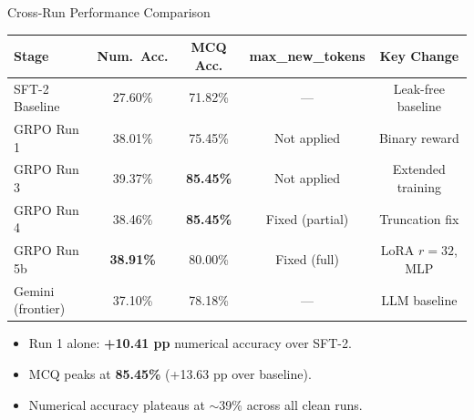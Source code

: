 \documentclass[10pt]{beamer}
\begin{document}
\begin{frame}{Cross-Run Performance Comparison}
\begin{center}
\footnotesize
\begin{tabular}{lcccc}
    \toprule
    \textbf{Stage} & \textbf{Num.\ Acc.} & \textbf{MCQ Acc.} & \textbf{max\_new\_tokens} & \textbf{Key Change} \\
    \midrule
    SFT-2 Baseline & 27.60\% & 71.82\% & --- & Leak-free baseline \\
    GRPO Run 1 & 38.01\% & 75.45\% & Not applied & Binary reward \\
    GRPO Run 3 & 39.37\% & \textbf{85.45\%} & Not applied & Extended training \\
    GRPO Run 4 & 38.46\% & \textbf{85.45\%} & Fixed (partial) & Truncation fix \\
    GRPO Run 5b & \textbf{38.91\%} & 80.00\% & Fixed (full) & LoRA $r=32$, MLP \\
    \midrule
    Gemini (frontier) & 37.10\% & 78.18\% & --- & LLM baseline \\
    \bottomrule
\end{tabular}
\end{center}

\vspace{0.3cm}
\large
\begin{itemize}
    \item Run 1 alone: \textbf{+10.41 pp} numerical accuracy over SFT-2.
    \item MCQ peaks at \textbf{85.45\%} (+13.63 pp over baseline).
    \item Numerical accuracy plateaus at $\sim$39\% across all clean runs.
\end{itemize}
\end{frame}
\end{document}
